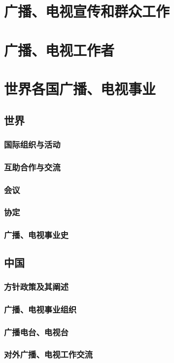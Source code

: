 \documentclass[UTF8]{../../ApplicationUniverse}
\begin{document}
\section{广播、电视宣传和群众工作}
\section{广播、电视工作者}
\section{世界各国广播、电视事业}
    \subsection{世界}
        \subsubsection{国际组织与活动}
        \subsubsection{互助合作与交流}
        \subsubsection{会议}
        \subsubsection{协定}
        \subsubsection{广播、电视事业史}
    \subsection{中国}
        \subsubsection{方针政策及其阐述}
        \subsubsection{广播、电视事业组织}
        \subsubsection{广播电台、电视台}
        \subsubsection{对外广播、电视工作交流}
\end{document}

